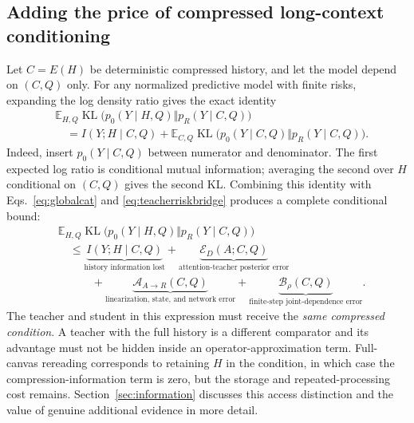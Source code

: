 \documentclass{article}
\theoremstyle{remark}\newtheorem{remark}[theorem]{Remark}
\newcommand{\E}{\mathbb E}
\newcommand{\KL}{\operatorname{KL}}
\begin{document}
\subsection{Adding the price of compressed long-context conditioning}
Let $C=E(H)$ be deterministic compressed history, and let the model depend on $(C,Q)$ only. For any normalized predictive model with finite risks, expanding the log density ratio gives the exact identity
\begin{align}
 &\E_{H,Q}\KL\bigl(p_0(Y\mid H,Q)\Vert p_R(Y\mid C,Q)\bigr)\nonumber\\
 &\quad=I(Y;H\mid C,Q)+
 \E_{C,Q}\KL\bigl(p_0(Y\mid C,Q)\Vert p_R(Y\mid C,Q)\bigr).
 \label{eq:compressionKLidentity}
\end{align}
Indeed, insert $p_0(Y\mid C,Q)$ between numerator and denominator. The first expected log ratio is conditional mutual information; averaging the second over $H$ conditional on $(C,Q)$ gives the second KL. Combining this identity with Eqs.~\eqref{eq:globalcat} and \eqref{eq:teacherriskbridge} produces a complete conditional bound:
\begin{equation}
 \boxed{\begin{aligned}
 &\E_{H,Q}\KL\bigl(p_0(Y\mid H,Q)\Vert p_R(Y\mid C,Q)\bigr)\\
 &\quad\le \underbrace{I(Y;H\mid C,Q)}_{\text{history information lost}}
 +\underbrace{\mathcal E_D(A;C,Q)}_{\text{attention-teacher posterior error}}\\
 &\qquad\quad+\underbrace{\mathcal A_{A\to R}(C,Q)}_{\text{linearization, state, and network error}}
 +\underbrace{\mathcal B_\rho(C,Q)}_{\text{finite-step joint-dependence error}}.
 \end{aligned}}
 \label{eq:masterbound}
\end{equation}
The teacher and student in this expression must receive the \emph{same compressed condition}. A teacher with the full history is a different comparator and its advantage must not be hidden inside an operator-approximation term. Full-canvas rereading corresponds to retaining $H$ in the condition, in which case the compression-information term is zero, but the storage and repeated-processing cost remains. Section~\ref{sec:information} discusses this access distinction and the value of genuine additional evidence in more detail.
\end{document}

